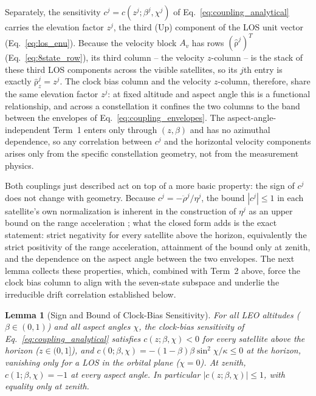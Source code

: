 \documentclass[letterpaper,times]{IONconf-v2}
\theoremstyle{plain}
\newtheorem{lemma}{Lemma}
\theoremstyle{remark}
\renewcommand{\vec}[1]{{\boldsymbol{\mathrm{#1}}}}
\begin{document}
Separately, the sensitivity $c^j = c(z^j;\beta^j,\chi^j)$ of Eq.~\eqref{eq:coupling_analytical} carries the elevation factor $z^j$, the third (Up) component of the LOS unit vector (Eq.~\eqref{eq:los_enu}). Because the velocity block $A_v$ has rows $(\hat{\vec\rho}^j)^T$ (Eq.~\eqref{eq:8state_row}), its third column -- the velocity $z$-column -- is the stack of these third LOS components across the visible satellites, so its $j$th entry is exactly $\hat{\vec\rho}_z^j = z^j$. The clock bias column and the velocity $z$-column, therefore, share the same elevation factor $z^j$: at fixed altitude and aspect angle this is a functional relationship, and across a constellation it confines the two columns to the band between the envelopes of Eq.~\eqref{eq:coupling_envelopes}. The aspect-angle-independent Term~1 enters only through $(z,\beta)$ and has no azimuthal dependence, so any correlation between $c^j$ and the horizontal velocity components arises only from the specific constellation geometry, not from the measurement physics.

Both couplings just described act on top of a more basic property: the sign of $c^j$ does not change with geometry. Because $c^j = -\ddot{\rho}^j/\eta^j$, the bound $|c^j| \le 1$ in each satellite's own normalization is inherent in the construction of $\eta^j$ as an upper bound on the range acceleration \parencite{Psiaki2021}; what the closed form adds is the exact statement: strict negativity for every satellite above the horizon, equivalently the strict positivity of the range acceleration, attainment of the bound only at zenith, and the dependence on the aspect angle between the two envelopes. The next lemma collects these properties, which, combined with Term~2 above, force the clock bias column to align with the seven-state subspace and underlie the irreducible drift correlation established below.

\begin{lemma}[Sign and Bound of Clock-Bias Sensitivity]\label{lem:c_negative}
For all LEO altitudes ($\beta \in (0,1)$) and all aspect angles $\chi$, the clock-bias sensitivity of Eq.~\eqref{eq:coupling_analytical} satisfies $c(z;\beta,\chi) < 0$ for every satellite above the horizon ($z \in (0,1]$), and $c(0;\beta,\chi) = -(1-\beta)\beta\sin^2\chi/\kappa \le 0$ at the horizon, vanishing only for a LOS in the orbital plane ($\chi = 0$). At zenith, $c(1;\beta,\chi) = -1$ at every aspect angle. In particular $|c(z;\beta,\chi)| \le 1$, with equality only at zenith.
\end{lemma}
\end{document}
